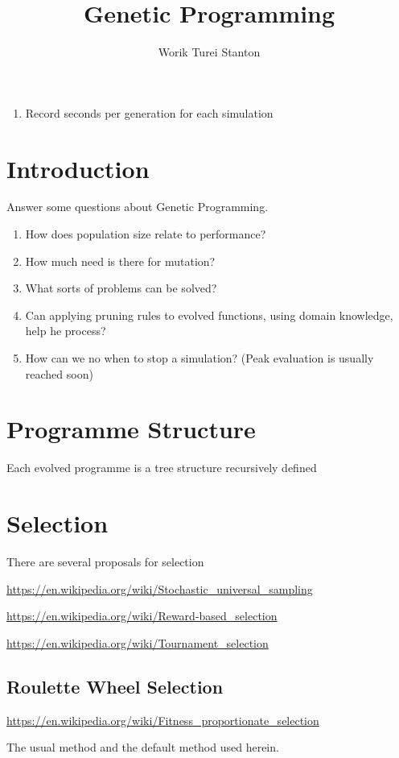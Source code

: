 \documentclass[a4paper,twoside]{article}
\title{Genetic Programming}
\author{Worik Turei Stanton}
\begin{document}
\begin{enumerate}
  \item Record seconds per generation for each simulation
\end{enumerate}

\section{Introduction}

Answer some questions about Genetic Programming.

\begin{enumerate}
\item How does population size relate to performance?
\item How much need is there for mutation?
\item What sorts of problems can be solved?
\item Can applying pruning rules to evolved functions, using domain
  knowledge, help he process?
\item How can we no when to stop a simulation? (Peak evaluation is
  usually reached soon)
\end{enumerate}

\section{Programme Structure}

Each evolved programme is a tree structure recursively defined 


\section{Selection}

There are several proposals for selection

\url{https://en.wikipedia.org/wiki/Stochastic_universal_sampling}

\url{https://en.wikipedia.org/wiki/Reward-based_selection}

\url{https://en.wikipedia.org/wiki/Tournament_selection}

\subsection{Roulette Wheel Selection}

\url{https://en.wikipedia.org/wiki/Fitness_proportionate_selection}

The usual method and the default method used herein.
\end{document}
